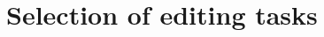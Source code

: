 \documentclass{aes130}
\begin{document}
%
%
%
%
%
%

\section{Selection of editing tasks} \label{sec:EditingTasks}
\end{document}
